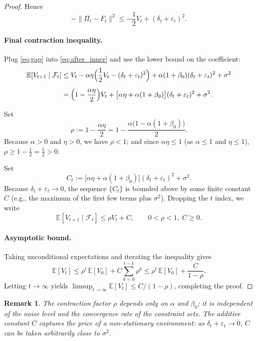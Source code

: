 \documentclass[11pt]{article}
\newtheorem{remark}[theorem]{Remark}
\begin{document}
\begin{proof}
Hence
\begin{equation}\label{eq:gap}
-\|\Pi_t - F_t\|^2 \le -\frac12 V_t + (\delta_t + \varepsilon_t)^2 .
\end{equation}

\paragraph{Final contraction inequality.}
Plug \eqref{eq:gap} into \eqref{eq:after_inner} and use the lower bound on the coefficient:
\begin{align}
\mathbb{E}[V_{t+1} \mid \mathcal{F}_t]
&\le V_t
   - \alpha\eta\Bigl(\frac12 V_t - (\delta_t + \varepsilon_t)^2\Bigr)
   + \alpha(1+\beta_0)(\delta_t + \varepsilon_t)^2
   + \sigma^2 \notag\\[2mm]
&= \Bigl(1 - \frac{\alpha\eta}{2}\Bigr) V_t
   + \bigl[\alpha\eta + \alpha(1+\beta_0)\bigr](\delta_t + \varepsilon_t)^2
   + \sigma^2 . \label{eq:final}
\end{align}

Set
\[
\boxed{\rho := 1 - \frac{\alpha\eta}{2} = 1 - \frac{\alpha\bigl(1 - \alpha(1+\beta_0)\bigr)}{2}} .
\]
Because \(\alpha>0\) and \(\eta>0\), we have \(\rho < 1\); and since \(\alpha\eta \le 1\) (as \(\alpha\le 1\) and \(\eta\le 1\)), \(\rho \ge 1 - \frac12 = \frac12 > 0\).

Set
\[
C_t := \bigl[\alpha\eta + \alpha(1+\beta_0)\bigr](\delta_t + \varepsilon_t)^2 + \sigma^2 .
\]
Because \(\delta_t+\varepsilon_t \to 0\), the sequence \(\{C_t\}\) is bounded above by some finite constant \(C\) (e.g., the maximum of the first few terms plus \(\sigma^2\)). Dropping the \(t\) index, we write
\[
\mathbb{E}[V_{t+1} \mid \mathcal{F}_t] \le \rho V_t + C,
\qquad 0 < \rho < 1,\; C \ge 0 .
\]

\paragraph{Asymptotic bound.}
Taking unconditional expectations and iterating the inequality gives
\[
\mathbb{E}[V_t] \le \rho^t\,\mathbb{E}[V_0] + C\sum_{k=0}^{t-1}\rho^k
\le \rho^t\,\mathbb{E}[V_0] + \frac{C}{1-\rho}.
\]
Letting \(t\to\infty\) yields \(\limsup_{t\to\infty} \mathbb{E}[V_t] \le C/(1-\rho)\), completing the proof.
\end{proof}

\begin{remark}
The contraction factor \(\rho\) depends only on \(\alpha\) and \(\beta_0\); it is independent of the noise level and the convergence rate of the constraint sets. The additive constant \(C\) captures the price of a non‑stationary environment: as \(\delta_t+\varepsilon_t \to 0\), \(C\) can be taken arbitrarily close to \(\sigma^2\).
\end{remark}
\end{document}
